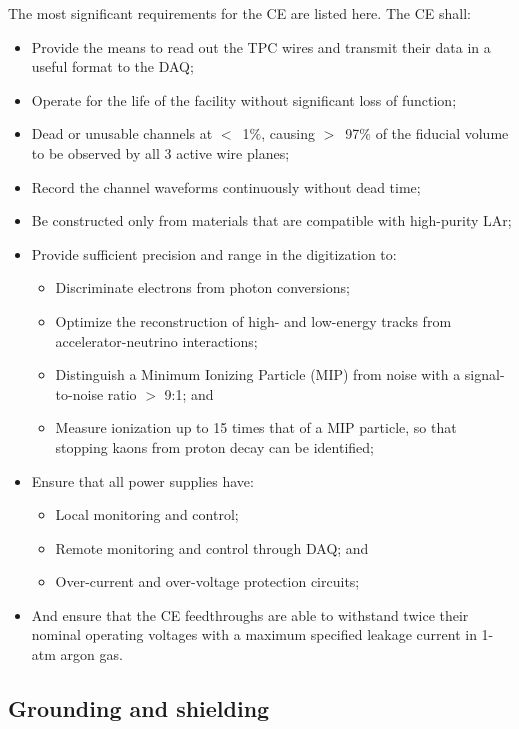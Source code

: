 The most significant requirements for the CE are listed here. The CE shall:

\begin{itemize}	
\item Provide the means to read out the TPC wires and transmit their data in a useful format to the DAQ;
\item Operate for the life of the facility without significant loss of function;
\item Dead or unusable channels at $<$~1$\%$, causing $>$~97$\%$ of the fiducial volume to be observed by all 3 active wire planes;
\item Record the channel waveforms continuously without dead time;
\item Be constructed only from materials that are compatible with high-purity LAr;
\item Provide sufficient precision and range in the digitization to:
\begin{itemize}
\item Discriminate electrons from photon conversions;
\item Optimize the reconstruction of high- and low-energy tracks from accelerator-neutrino interactions;
\item Distinguish a Minimum Ionizing Particle (MIP) from noise with a signal-to-noise ratio $>$ 9:1; and
\item Measure ionization up to 15 times that of a MIP particle, so that stopping kaons from proton decay can be identified;
\end{itemize}
\item Ensure that all power supplies have: 
\begin{itemize}
\item Local monitoring and control;
\item Remote monitoring and control through DAQ; and
\item Over-current and over-voltage protection circuits;
\end{itemize}
\item And ensure that the CE feedthroughs are able to withstand twice their nominal operating voltages 
with a maximum specified leakage current in 1-atm argon gas.
\end{itemize}


\subsection{Grounding and shielding}
\label{subsec:groundshield}

